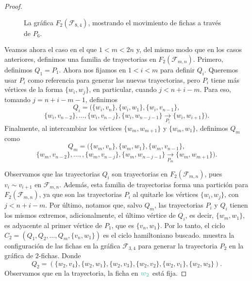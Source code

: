 \begin{proof}
\begin{figure}[ht!]
    \caption{La gr\'afica $F_2(\mathcal{F}_{8,4})$, mostrando el movimiento de
        fichas a trav\'es de $P_6$.}
        \label{fig:exe-tray-n-2n}
\end{figure}
    
Veamos ahora el caso en el que $1<m<2n$ y, del mismo modo que en los casos
anteriores, definimos una familia de trayectorias en $F_2(\mathcal{F}_{m,n})$.
Primero, definimos $Q_1 =P_1$. Ahora nos fijamos en $1<i<m$ para definir $Q_i$.
Queremos usar $P_i$ como referencia para generar las nuevas trayectorias, pero
$P_i$ tiene m\'as v\'ertices de la forma $\{w_i,w_j\}$, en particular, cuando
$j< n+i-m$. Para eso, tomando $j = n+i-m-1$, definimos 
\[Q_i = (\{w_i,v_n\},\{w_i,w_1\},\{w_i,v_{n-1}\},\]
\[\{w_i,v_{n-2}\}, \dots,
\{w_i,v_{n-j}\},\{w_i,w_{n-j-1}\}\xrightarrow[P_i]{}\{w_i,w_{i+1}\}).
\]
Finalmente, al intercambiar los v\'ertices $\{w_m,w_{m+1}\}$ y $\{w_m,w_1\}$,
definimos $Q_m$ como
\[
    Q_m=(\{w_m,v_n\},\{w_m,w_1\},\{w_m,v_{n-1}\},\]
    \[\{w_m,v_{n-2}\}, \dots,
,\{w_m,v_{n-j}\},\{w_m,w_{n-j-1}\}\xrightarrow[P_m]{}\{w_m,w_{m+1}\}).
    \] 
    
Observamos que las trayectorias $Q_i$ son trayectorias en
$F_2(\mathcal{F}_{m,n})$, pues $v_i \sim v_{i+1}$ en $\mathcal{F}_{m,n}$.
Adem\'as, esta familia de trayectorias forma una partici\'on para
$F_2(\mathcal{F}_{m,n})$, ya que son las trayectorias $P_i$ al quitarle los
v\'ertices $\{w_i,w_j\}$, con $j< n+i-m$. Por \'ultimo, notamos que, salvo
$Q_m$, las trayectorias $P_i$ y $Q_i$ tienen los mismos extremos,
adicionalmente, el \'ultimo v\'ertice de $Q_i$, es decir, $\{w_m,w_1\}$, es
adyacente al primer v\'ertice de $P_1$, que es $\{v_n,w_1\}$. Por lo tanto, el
ciclo $C_2=(Q_1,Q_2, \dots, Q_m, \{v_n,w_1\})$ es el ciclo hamiltoniano buscado.
 muestra la configuraci\'on de las fichas en la gr\'afica
$\mathcal{F}_{3,4}$ para generar la trayectoria $P_2$ en la gr\'afica de
$2$-fichas. Donde
\[
Q_2=(\{w_2,v_4\},\{w_2,w_1\},\{w_2,v_3\},\{w_2,v_2\},\{w_2,v_1\},\{w_2,w_3\}).
\]
Observamos que en la trayectoria, la ficha en ${\color{azulClaro} \boldsymbol
{w_2}}$ est\'a fija.


\end{proof}
